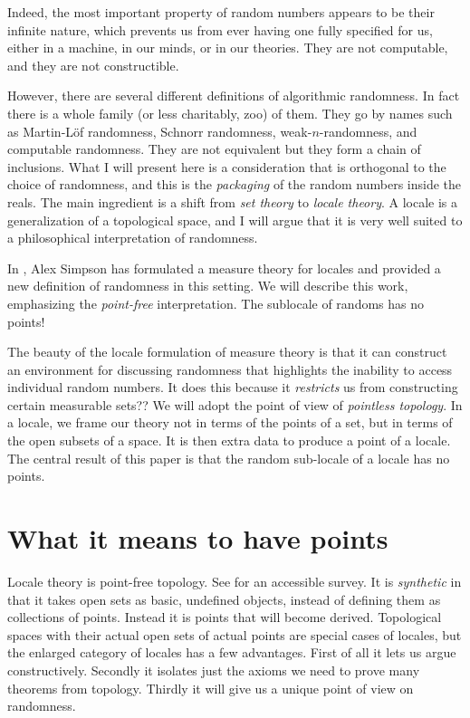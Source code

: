 \documentclass[12pt]{article}
\begin{document}
Indeed, the most important property of random numbers appears to be their infinite nature, which prevents us from ever having one fully specified for us, either in a machine, in our minds, or in our theories. They are not computable, and they are not constructible.

However, there are several different definitions of algorithmic randomness. In fact there is a whole family (or less charitably, zoo) of them. They go by names such as Martin-Löf randomness, Schnorr randomness, weak-$n$-randomness, and computable randomness. They are not equivalent but they form a chain of inclusions. What I will present here is a consideration that is orthogonal to the choice of randomness, and this is the \emph{packaging} of the random numbers inside the reals. The main ingredient is a shift from \emph{set theory} to \emph{locale theory}. A locale is a generalization of a topological space, and I will argue that it is very well suited to a philosophical interpretation of randomness.

In \cite{simpson}, Alex Simpson has formulated a measure theory for locales and provided a new definition of randomness in this setting. We will describe this work, emphasizing the \emph{point-free} interpretation. The sublocale of randoms has no points!

The beauty of the locale formulation of measure theory is that it can construct an environment for discussing randomness that highlights the inability to access individual random numbers. It does this because it \emph{restricts} us from constructing certain measurable sets?? We will adopt the point of view of \emph{pointless topology}. In a locale, we frame our theory not in terms of the points of a set, but in terms of the open subsets of a space. It is then extra data to produce a point of a locale. The central result of this paper is that the random sub-locale of a locale has no points.

\section{What it means to have points}
Locale theory is point-free topology. See \cite{johnstone1983} for an accessible survey. It is \emph{synthetic} in that it takes open sets as basic, undefined objects, instead of defining them as collections of points. Instead it is points that will become derived. Topological spaces with their actual open sets of actual points are special cases of locales, but the enlarged category of locales has a few advantages. First of all it lets us argue constructively. Secondly it isolates just the axioms we need to prove many theorems from topology. Thirdly it will give us a unique point of view on randomness.
\end{document}
